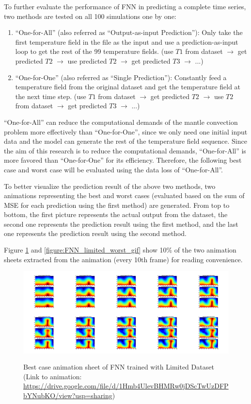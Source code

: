 To further evaluate the performance of FNN in predicting a complete time series, two methods are tested on all 100 simulations one by one: 

\begin{enumerate}
  \item ``One-for-All'' (also referred as ``Output-as-input Prediction''): Only take the first temperature field in the file as the input and use a prediction-as-input loop to get the rest of the 99 temperature fields. (use $T1$ from dataset $\rightarrow$ get predicted $T2$ $\rightarrow$ use predicted $T2$ $\rightarrow$ get predicted $T3$ $\rightarrow$ ...)
  \item ``One-for-One'' (also referred as ``Single Prediction''): Constantly feed a temperature field from the original dataset and get the temperature field at the next time step. (use $T1$ from dataset $\rightarrow$ get predicted $T2$ $\rightarrow$ use $T2$ from dataset $\rightarrow$ get predicted $T3$ $\rightarrow$ ...)
\end{enumerate}

 ``One-for-All'' can reduce the computational demands of the mantle convection problem more effectively than ``One-for-One'', since we only need one initial input data and the model can generate the rest of the temperature field sequence. Since the aim of this research is to reduce the computational demands, ``One-for-All'' is more favored than ``One-for-One'' for its efficiency. Therefore, the following best case and worst case will be evaluated using the data loss of ``One-for-All''.

To better visualize the prediction result of the above two methods, two animations representing the best and worst cases (evaluated based on the sum of MSE for each prediction using the first method) are generated. From top to bottom, the first picture represents the actual output from the dataset, the second one represents the prediction result using the first method, and the last one represents the prediction result using the second method.

Figure \ref{figure:FNN_limited_best_gif} and \ref{figure:FNN_limited_worst_gif} show 10\% of the two animation sheets extracted from the animation (every 10th frame) for reading convenience.

\begin{figure}[H]
    \centering
    \caption{Best case animation sheet of FNN trained with Limited Dataset (Link to animation: \url{https://drive.google.com/file/d/1Hmb4UlevBHMRw0jDScTwUzDFPbYNubKO/view?usp=sharing})}
    \includegraphics[scale=0.10]{figures/mantle_convection_images/limited_dataset/FNN_Best_GIF_sheet.png}
    \label{figure:FNN_limited_best_gif}
\end{figure}

